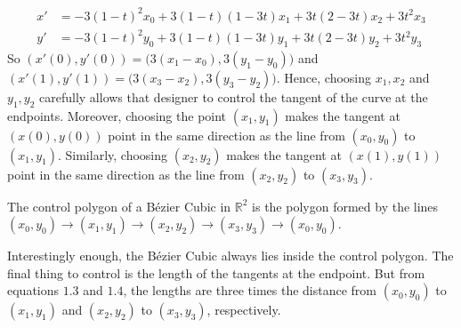 \documentclass[crop=false,class=book]{standalone}
\begin{document}
\begin{align*}
    x' &= -3(1-t)^2x_0 + 3(1-t)(1-3t)x_1+3t(2-3t)x_2+3t^2x_3 \\
    y' &= -3(1-t)^2y_0 + 3(1-t)(1-3t)y_1+3t(2-3t)y_2+3t^2y_3
\end{align*}
So $(x'(0),y'(0)) = \big(3(x_1-x_0),3(y_1-y_0)\big)$ and $(x'(1),y'(1)) = \big(3(x_3-x_2),3(y_3-y_2)\big)$. Hence, choosing $x_1,x_2$ and $y_1,y_2$ carefully allows that designer to control the tangent of the curve at the endpoints. Moreover, choosing the point $(x_1,y_1)$ makes the tangent at $(x(0),y(0))$ point in the same direction as the line from $(x_0,y_0)$ to $(x_1,y_1)$. Similarly, choosing $(x_2,y_2)$ makes the tangent at $(x(1),y(1))$ point in the same direction as the line from $(x_2,y_2)$ to $(x_3,y_3)$.
\begin{definition}
The control polygon of a B\'{e}zier Cubic in $\mathbb{R}^2$ is the polygon formed by the lines $(x_0,y_0)\rightarrow(x_1,y_1)\rightarrow(x_2,y_2)\rightarrow(x_3,y_3)\rightarrow (x_0,y_0)$.
\end{definition}
Interestingly enough, the B\'{e}zier Cubic always lies inside the control polygon. The final thing to control is the length of the tangents at the endpoint. But from equations $1.3$ and $1.4$, the lengths are three times the distance from $(x_0,y_0)$ to $(x_1,y_1)$ and $(x_2,y_2)$ to $(x_3,y_3)$, respectively. 
\end{document}
